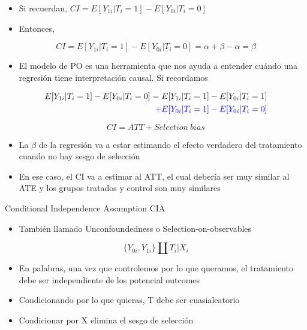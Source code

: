 \documentclass[
  ignorenonframetext,
]{beamer}
\providecommand{\tightlist}{%
  \setlength{\itemsep}{0pt}\setlength{\parskip}{0pt}}
\begin{document}
\begin{frame}{}
\protect\hypertarget{section-24}{}
\begin{itemize}
\tightlist
\item
  Si recuerdan, \(CI=E[Y_{1i}| T_i=1]-E[Y_{0i}| T_i=0]\)
\item
  Entonces,
\end{itemize}

\[CI=E[Y_{1i}| T_i=1]-E[Y_{0i}| T_i=0]=\alpha+\beta-\alpha=\beta\]
\end{frame}

\begin{frame}{}
\protect\hypertarget{section-25}{}
\begin{itemize}
\tightlist
\item
  El modelo de PO es una herramienta que nos ayuda a entender cuándo una
  regresión tiene interpretación causal. Si recordamos
\end{itemize}

\begin{equation}
\begin{aligned}
 E[Y_{1i} |T_i=1]-E[Y_{0i}|T_i=0]= E[Y_{1i} |T_i=1] - E[Y_{0i}|T_i=1] \\ 
 \color{blue}{+ E[Y_{0i}|T_i=1]-E[Y_{0i}|T_i=0]} \\
\end{aligned}
\end{equation}

\[CI=ATT+Selection \ bias\]
\end{frame}

\begin{frame}{}
\protect\hypertarget{section-26}{}
\begin{itemize}
\tightlist
\item
  La \(\beta\) de la regresión va a estar estimando el efecto verdadero
  del tratamiento cuando no hay sesgo de selección
\item
  En ese caso, el CI va a estimar al ATT, el cual debería ser muy
  similar al ATE y los grupos tratados y control son muy similares
\end{itemize}
\end{frame}

\begin{frame}{Conditional Independence Assumption CIA}
\protect\hypertarget{conditional-independence-assumption-cia}{}
\begin{itemize}
\tightlist
\item
  También llamado Unconfoundedness o Selection-on-observables
\end{itemize}

\[\{Y_{0i}, Y_{1i}\} \amalg T_i |X_i\]

\begin{itemize}
\tightlist
\item
  En palabras, una vez que controlemos por lo que queramos, el
  tratamiento debe ser independiente de los potencial outcomes
\item
  Condicionando por lo que quieras, T debe ser cuasialeatorio
\item
  Condicionar por X elimina el sesgo de selección
\end{itemize}
\end{frame}
\end{document}
